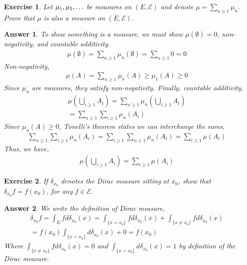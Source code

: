 \documentclass[12pt]{article}
\theoremstyle{colon}
\newtheorem{exercise}{Exercise}
\newtheorem*{answer}{Answer}
\begin{document}
\clearpage

\begin{exercise}
  Let $\mu_1, \mu_2,\mathellipsis$ be measures on $(E, \mathcal{E})$ and denote $\mu = \sum_{n \geq 1} \mu_n$. Prove that $\mu$ is also a measure on $(E, \mathcal{E})$.
\end{exercise}

\begin{answer}
  To show something is a measure, we must show $\mu(\emptyset) = 0$, non-negativity, and countable additivity.
  \begin{gather*}
    \mu(\emptyset) = \sum_{n \geq 1} \mu_n(\emptyset) = \sum_{n \geq 1} 0 = 0
  \end{gather*}
  Non-negativity,
  \begin{gather*}
    \mu(A) = \sum_{n \geq 1} \mu_n(A) \geq \mu_1(A) \geq 0
  \end{gather*}
  Since $\mu_n$ are measures, they satisfy non-negativity. Finally, countable additivity,
  \begin{gather*}
    \mu \left( \bigcup_{i \geq 1} A_i \right) = \sum_{n \geq 1} \mu_n \left( \bigcup_{i \geq 1} A_i \right) \\
    = \sum_{n \geq 1} \sum_{i \geq 1} \mu_n (A_i)
  \end{gather*}
  Since $\mu_n(A) \geq 0$, Tonelli's theorem  states we can interchange the sums,
  \begin{gather*}
    \sum_{n \geq 1} \sum_{i \geq 1} \mu_n (A_i) = \sum_{i \geq 1} \sum_{n \geq 1} \mu_n (A_i) = \sum_{i \geq 1} \mu (A_i)
  \end{gather*}
  Thus, we have,
  \begin{gather*}
    \mu \left( \bigcup_{i \geq 1} A_i \right) = \sum_{i \geq 1} \mu (A_i)
  \end{gather*}
\end{answer}

\clearpage

\begin{exercise}
  If $\delta_{x_0}$ denotes the Dirac measure sitting at $x_0$, show that $\delta_{x_0} f = f(x_0)$, for any $f \in \mathcal{E}$.
\end{exercise}

\begin{answer}
  We write the definition of Dirac measure,
  \begin{gather*}
    \delta_{x_0} f = \int_E f d\delta_{x_0}(x) = \int_{\{ x = x_0 \}} f d\delta_{x_0}(x) + \int_{\{ x \neq x_0 \}} f d\delta_{x_0}(x)\\
    = f(x_0)\int_{\{ x = x_0 \}} d\delta_{x_0}(x) + 0 = f(x_0)
  \end{gather*}
  Where $\int_{\{ x \neq x_0 \}} f d\delta_{x_0}(x) = 0$ and $\int_{\{ x = x_0 \}} d\delta_{x_0}(x) = 1$  by definition of the Dirac measure.
\end{answer}
\end{document}
